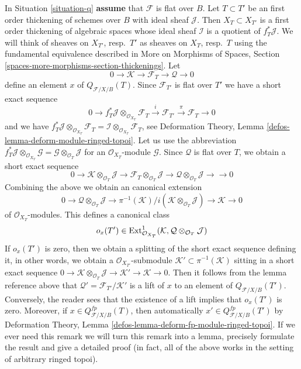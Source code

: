 \begin{remark}
\label{remark-q-obs}
In Situation \ref{situation-q} {\bf assume} that $\mathcal{F}$ is flat
over $B$. Let $T \subset T'$ be an first order
thickening of schemes over $B$ with ideal sheaf $\mathcal{J}$. Then
$X_T \subset X_{T'}$ is a first order thickening of algebraic spaces
whose ideal sheaf $\mathcal{I}$ is a quotient of $f_T^*\mathcal{J}$.
We will think of sheaves on $X_{T'}$, resp.\ $T'$ as sheaves on
$X_T$, resp.\ $T$ using the fundamental equivalence described in
More on Morphisms of Spaces, Section
\ref{spaces-more-morphisms-section-thickenings}.
Let
$$
0 \to \mathcal{K} \to \mathcal{F}_T \to \mathcal{Q} \to 0
$$
define an element $x$ of $Q_{\mathcal{F}/X/B}(T)$. Since $\mathcal{F}_{T'}$
is flat over $T'$ we have a short exact sequence
$$
0 \to f_T^*\mathcal{J} \otimes_{\mathcal{O}_{X_T}} \mathcal{F}_T
\xrightarrow{i} \mathcal{F}_{T'} \xrightarrow{\pi} \mathcal{F}_T \to 0
$$
and we have
$f_T^*\mathcal{J} \otimes_{\mathcal{O}_{X_T}} \mathcal{F}_T =
\mathcal{I} \otimes_{\mathcal{O}_{X_T}} \mathcal{F}_T$, see
Deformation Theory, Lemma \ref{defos-lemma-deform-module-ringed-topoi}.
Let us use the abbreviation
$
f_T^*\mathcal{J} \otimes_{\mathcal{O}_{X_T}} \mathcal{G} =
\mathcal{G} \otimes_{\mathcal{O}_T} \mathcal{J}
$
for an $\mathcal{O}_{X_T}$-module $\mathcal{G}$.
Since $\mathcal{Q}$ is flat over $T$, we obtain a short exact sequence
$$
0 \to
\mathcal{K} \otimes_{\mathcal{O}_T} \mathcal{J} \to
\mathcal{F}_T \otimes_{\mathcal{O}_T} \mathcal{J} \to
\mathcal{Q} \otimes_{\mathcal{O}_T} \mathcal{J} \to
\to 0
$$
Combining the above we obtain an canonical extension
$$
0 \to \mathcal{Q} \otimes_{\mathcal{O}_T} \mathcal{J} \to
\pi^{-1}(\mathcal{K})/i(\mathcal{K} \otimes_{\mathcal{O}_T} \mathcal{J}) \to
\mathcal{K} \to 0
$$
of $\mathcal{O}_{X_T}$-modules. This defines a canonical class
$$
o_x(T') \in
\mathop{\mathrm{Ext}}\nolimits^1_{\mathcal{O}_{X_T}}(\mathcal{K},
\mathcal{Q} \otimes_{\mathcal{O}_T} \mathcal{J})
$$
If $o_x(T')$ is zero, then we obtain a splitting of the short
exact sequence defining it, in other words, we obtain a
$\mathcal{O}_{X_{T'}}$-submodule
$\mathcal{K}' \subset \pi^{-1}(\mathcal{K})$ sitting in a short
exact sequence
$0 \to \mathcal{K} \otimes_{\mathcal{O}_T} \mathcal{J} \to
\mathcal{K}' \to \mathcal{K} \to 0$.
Then it follows from the lemma reference above that
$\mathcal{Q}' = \mathcal{F}_{T'}/\mathcal{K}'$
is a lift of $x$ to an element of $Q_{\mathcal{F}/X/B}(T')$.
Conversely, the reader sees that the existence of
a lift implies that $o_x(T')$ is zero. Moreover, if
$x \in Q_{\mathcal{F}/X/B}^{fp}(T)$, then automatically
$x' \in Q_{\mathcal{F}/X/B}^{fp}(T')$ by
Deformation Theory, Lemma \ref{defos-lemma-deform-fp-module-ringed-topoi}.
If we ever need this
remark we will turn this remark into a lemma, precisely formulate
the result and give a detailed proof (in fact, all of the above
works in the setting of arbitrary ringed topoi).
\end{remark}

